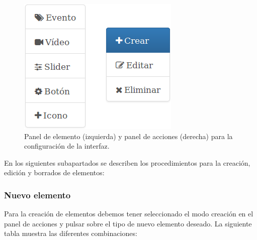 \begin{figure}[H]
  \begin{center}
    \includegraphics[scale=.6]{imagenes/manual-usuario/barra-herramientas-interfaz.png}
  \end{center}
  \caption{Panel de elemento (izquierda) y panel de acciones (derecha) para la configuración de la interfaz.}
  \label{website:pagina-principal}
\end{figure}


En los siguientes subapartados se describen los procedimientos para la creación, edición y borrados de elementos:\\


\subsubsection{Nuevo elemento}

 Para la creación de elementos debemos tener seleccionado el modo creación en el panel de acciones y pulsar sobre el tipo de nuevo elemento deseado. La siguiente tabla muestra las diferentes combinaciones:
  
